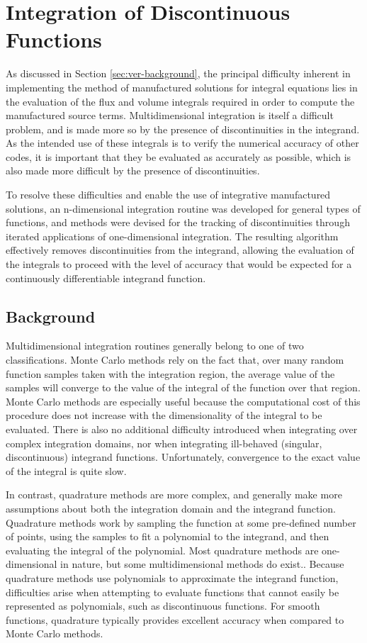 \chapter{Integration of Discontinuous Functions}
\label{chpt:integration}

As discussed in Section \ref{sec:ver-background}, the principal difficulty inherent in implementing the method of manufactured solutions for integral equations lies in the evaluation of the flux and volume integrals required in order to compute the manufactured source terms. Multidimensional integration is itself a difficult problem, and is made more so by the presence of discontinuities in the integrand. As the intended use of these integrals is to verify the numerical accuracy of other codes, it is important that they be evaluated as accurately as possible, which is also made more difficult by the presence of discontinuities. 

To resolve these difficulties and enable the use of integrative manufactured solutions, an n-dimensional integration routine was developed for general types of functions, and methods were devised for the tracking of discontinuities through iterated applications of one-dimensional integration. The resulting algorithm effectively removes discontinuities from the integrand, allowing the evaluation of the integrals to proceed with the level of accuracy that would be expected for a continuously differentiable integrand function.

\section{Background}
\label{sec:int-background}

Multidimensional integration routines generally belong to one of two classifications. Monte Carlo methods rely on the fact that, over many random function samples taken with the integration region, the average value of the samples will converge to the value of the integral of the function over that region. Monte Carlo methods are especially useful because the computational cost of this procedure does not increase with the dimensionality of the integral to be evaluated. There is also no additional difficulty introduced when integrating over complex integration domains, nor when integrating ill-behaved (singular, discontinuous) integrand functions. Unfortunately, convergence to the exact value of the integral is quite slow.

In contrast, quadrature methods are more complex, and generally make more assumptions about both the integration domain and the integrand function. Quadrature methods work by sampling the function at some pre-defined number of points, using the samples to fit a polynomial to the integrand, and then evaluating the integral of the polynomial. Most quadrature methods are one-dimensional in nature, but some multidimensional methods do exist.\cite{Cuba/Cubature}. Because quadrature methods use polynomials to approximate the integrand function, difficulties arise when attempting to evaluate functions that cannot easily be represented as polynomials, such as discontinuous functions. For smooth functions, quadrature typically provides excellent accuracy when compared to Monte Carlo methods.

